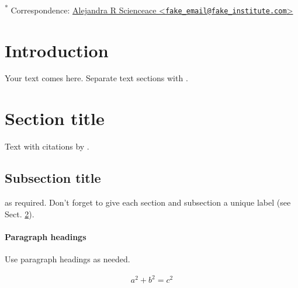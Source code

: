 \documentclass[smallextended]{svjour3}       %
\begin{document}
\textsuperscript{*} Correspondence: \href{mailto:fake_email@fake_institute.com}{Alejandra R Scienceace \textless{}\href{mailto:fake_email@fake_institute.com}{\nolinkurl{fake\_email@fake\_institute.com}}\textgreater{}}

\hypertarget{intro}{%
\section{Introduction}\label{intro}}

Your text comes here. Separate text sections with \cite{Mislevy06Cog}.

\hypertarget{sec:1}{%
\section{Section title}\label{sec:1}}

Text with citations by \cite{Galyardt14mmm}.

\hypertarget{sec:2}{%
\subsection{Subsection title}\label{sec:2}}

as required. Don't forget to give each section
and subsection a unique label (see Sect. \ref{sec:1}).

\hypertarget{paragraph-headings}{%
\paragraph{Paragraph headings}\label{paragraph-headings}}

Use paragraph headings as needed.

\begin{align}
a^2+b^2=c^2
\end{align}




\end{document}
